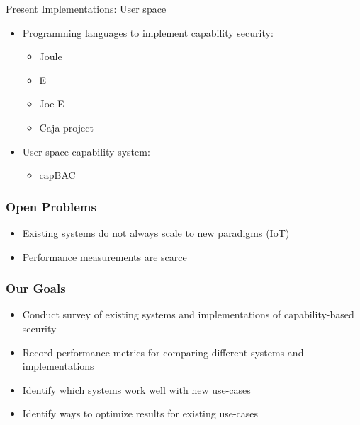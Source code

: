 \documentclass[xcolor=table]{beamer}
\begin{document}
\begin{frame}{Present Implementations: User space}
\begin{itemize}
    \item Programming languages to implement capability security:
    \begin{itemize}
        \item Joule
        \item E
        \item Joe-E
        \item Caja project
    \end{itemize}

    \item User space capability system:
    \begin{itemize}
        \item capBAC
    \end{itemize}
\end{itemize}

\end{frame}

\begin{frame}
  \frametitle{Open Problems}
    \begin{itemize}
        \item Existing systems do not always scale to new paradigms (IoT)
        \item Performance measurements are scarce 
    \end{itemize}
 
\end{frame}

\begin{frame}
  \frametitle{Our Goals}
   \begin{itemize}
      \item Conduct survey of existing systems and implementations of capability-based security
      \item Record performance metrics for comparing different systems and implementations
      \item Identify which systems work well with new use-cases
      \item Identify ways to optimize results for existing use-cases
      
      
  \end{itemize}
\end{frame}
\end{document}

